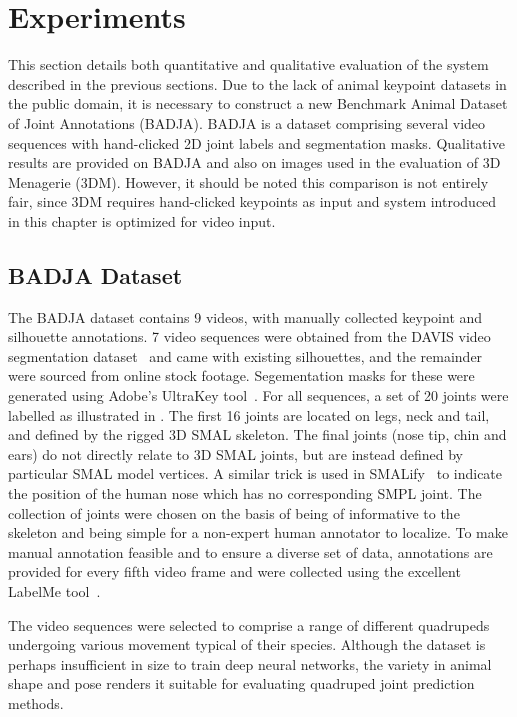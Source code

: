 
\section{Experiments}
This section details both quantitative and qualitative evaluation of the system described in the previous sections. Due to the lack of animal keypoint datasets in the public domain, it is necessary to construct a new Benchmark Animal Dataset of Joint Annotations (BADJA). BADJA is a dataset comprising several video sequences with hand-clicked 2D joint labels and segmentation masks. Qualitative results are provided on BADJA and also on images used in the evaluation of 3D Menagerie (3DM). However, it should be noted this comparison is not entirely fair, since 3DM requires hand-clicked keypoints as input and system introduced in this chapter is optimized for video input.

\subsection{BADJA Dataset}
The BADJA dataset contains 9 videos, with manually collected keypoint and silhouette annotations. 7 video sequences were obtained from the DAVIS video segmentation dataset~\cite{Perazzi2016} and came with existing silhouettes, and the remainder were sourced from online stock footage. Segementation masks for these were generated using Adobe's UltraKey tool~\cite{adobe_ultrakey}. For all sequences, a set of 20 joints were labelled as illustrated in . The first 16 joints are located on legs, neck and tail, and defined by the rigged 3D SMAL skeleton. The final joints (nose tip, chin and ears) do not directly relate to 3D SMAL joints, but are instead defined by particular SMAL model vertices. A similar trick is used in SMALify~\cite{bogo16keep} to indicate the position of the human nose which has no corresponding SMPL joint. The collection of joints were chosen on the basis of being of informative to the skeleton and being simple for a non-expert human annotator to localize. To make manual annotation feasible and to ensure a diverse set of data, annotations are provided for every fifth video frame and were collected using the excellent LabelMe tool~. 

The video sequences were selected to comprise a range of different quadrupeds undergoing various movement typical of their species. Although the dataset is perhaps insufficient in size to train deep neural networks, the variety in animal shape and pose renders it suitable for evaluating quadruped joint prediction methods. 


